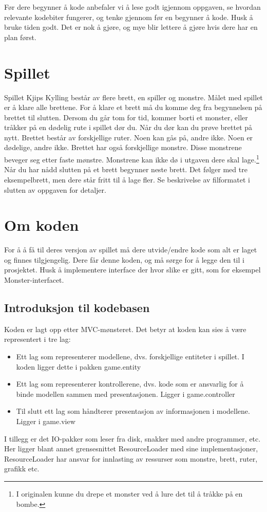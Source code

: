 \documentclass[norsk]{article}
\begin{document}
Før dere begynner å kode anbefaler vi å lese godt igjennom oppgaven, se hvordan relevante kodebiter fungerer, og tenke gjennom før en begynner å kode.
Husk å bruke tiden godt. Det er nok å gjøre, og mye blir lettere å gjøre hvis dere har en plan først. %

\section{Spillet}
\label{sec:spillet}
Spillet Kjips Kylling består av flere brett, en spiller og monstre.
Målet med spillet er å klare alle brettene.
For å klare et brett må du komme deg fra begynnelsen på brettet til slutten.
Dersom du går tom for tid, kommer borti et monster, eller tråkker på en dødelig rute i spillet dør du.
Når du dør kan du prøve brettet på nytt.
Brettet består av forskjellige ruter. Noen kan gås på, andre ikke. Noen er dødelige, andre ikke.
Brettet har også forskjellige monstre. Disse monstrene beveger seg etter faste mønstre. Monstrene kan ikke dø i utgaven dere skal lage.\footnote{I originalen kunne du drepe et monster ved å lure det til å tråkke på en bombe.}
Når du har nådd slutten på et brett begynner neste brett. Det følger med tre eksempelbrett, men dere står fritt til å lage fler.
Se beskrivelse av filformatet i slutten av oppgaven for detaljer.\\

\section{Om koden}
\label{sec:om-koden}
For å å få til deres versjon av spillet må dere utvide/endre kode som alt er laget og finnes tilgjengelig.
Dere får denne koden, og må sørge for å legge den til i prosjektet. Husk å implementere interface der hvor slike er gitt, som for eksempel Monster-interfacet.
\subsection{Introduksjon til kodebasen}
\label{subsec:kodebase-intro}
Koden er lagt opp etter MVC-mønsteret. Det betyr at koden kan sies å være representert i tre lag:
\begin{itemize}
\item Ett lag som representerer modellene, dvs. forskjellige entiteter i spillet. I koden ligger dette i pakken game.entity
\item Ett lag som representerer kontrollerene, dvs. kode som er ansvarlig for å binde modellen sammen med presentasjonen. Ligger i game.controller
\item Til slutt ett lag som håndterer presentasjon av informasjonen i modellene. Ligger i game.view
\end{itemize}
I tillegg er det IO-pakker som leser fra disk, snakker med andre programmer, etc.
Her ligger blant annet grensesnittet ResourceLoader med sine implementasjoner, ResourceLoader har ansvar for innlasting av ressurser som monstre, brett, ruter, grafikk etc.
\end{document}
